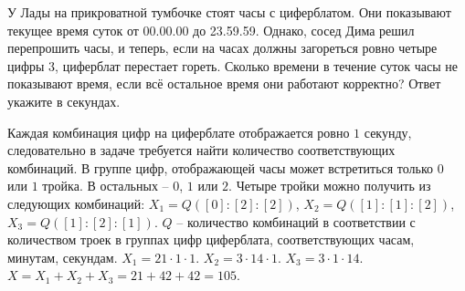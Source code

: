 
У Лады на прикроватной тумбочке стоят часы с циферблатом. Они показывают текущее время суток от 00.00.00 до 23.59.59. Однако, сосед Дима решил перепрошить часы, и теперь, если на часах должны загореться ровно четыре цифры 3, циферблат перестает гореть. Сколько времени в течение суток часы не показывают время, если всё остальное время они работают корректно? Ответ укажите в секундах.

\solutionSection

Каждая комбинация цифр на циферблате отображается ровно $1$ секунду, следовательно в задаче требуется найти количество соответствующих комбинаций. В группе цифр, отображающей часы может встретиться только $0$ или $1$ тройка. В остальных -- $0$, $1$ или $2$. Четыре тройки можно получить из следующих комбинаций: $X_1 = Q([0]:[2]:[2])$, $X_2 = Q([1]:[1]:[2])$, $X_3 = Q([1]:[2]:[1])$. $Q$ -- количество комбинаций в соответствии с количеством троек в группах цифр циферблата, соответствующих часам, минутам, секундам. $X_1 = 21 \cdot 1 \cdot 1$. $X_2 = 3 \cdot 14 \cdot 1$. $X_3 = 3 \cdot 1 \cdot 14$. $X = X_1 + X_2 + X_3 = 21 + 42 + 42 = 105$.


